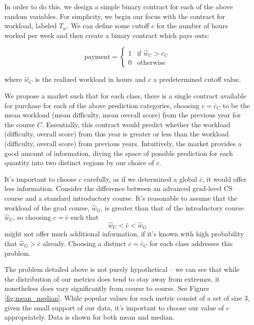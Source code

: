 In order to do this, we design a simple binary contract for each of the above random variables. For simplicity, we begin our focus with the contract for workload, labeled $T_w$. We can define some cutoff $c$ for the number of hours worked per week and then create a binary contract which pays outs:

\[\mbox{payment} = \begin{cases}
1 &\mbox{if } \hat{w}_C > c_C\\
0 &\mbox{otherwise}
\end{cases}\]

where $\hat{w}_C$ is the realized workload in hours and $c$ a predetermined cutoff value.

We propose a market such that for each class, there is a single contract available for purchase for each of the above prediction categories, choosing $c = \bar{c}_C$ to be the mean workload (mean difficulty, mean overall score) from the previous year for the course $C$. Essentially, this contract would predict whether the workload (difficulty, overall score) from this year is greater or less than the workload (difficulty, overall score) from previous years. Intuitively, the market provides a good amount of information, diving the space of possible prediction for each quantity into two distinct regions by our choice of $c$.  

It's important to choose $c$ carefully, as if we determined a global $\bar{c}$, it would offer less information. Consider the difference between an advanced grad-level CS course and a standard introductory course. It's reasonable to assume that the workload of the grad course, $\hat{w}_G$, is greater than that of the introductory course $\hat{w}_U$, so choosing $c = \bar{c}$ such that 
\[ \hat{w}_U < \bar{c} < \hat{w}_G\] might not offer much additional information, if it's known with high probability that $\hat{w}_G > \bar{c}$ already. Choosing a distinct $c = \bar{c}_C$ for each class addresses this problem.

The problem detailed above is not purely hypothetical -- we can see that while the distribution of our metrics does tend to stay away from extremes, it nonetheless does vary significantly from course to course. See Figure \ref{fig:mean_median}. While popular values for each metric consist of a set of size 3, given the small support of our data, it's important to choose our value of $c$ appropriately. Data is shown for both mean and median.

